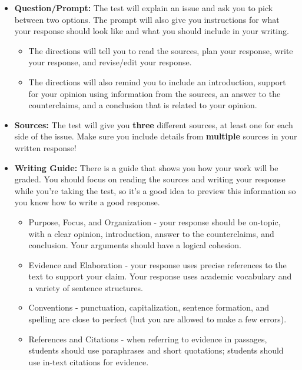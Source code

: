 \documentclass[12pt]{article}
\begin{document}
\vspace{1em}
\begin{tcolorbox}[colframe=black!60, colback=white, 
coltitle=black, colbacktitle=black!15, fonttitle=\bfseries\Large, 
title=What does the Writing Task Look Like?, halign title=center, left=10pt, right=10pt, top=10pt, bottom=15pt]

\begin{itemize}
    \item \textbf{Question/Prompt:} The test will explain an issue and ask you to pick between two options. The prompt will also give you instructions for what your response should look like and what you should include in your writing.
    \begin{itemize}
        \item The directions will tell you to read the sources, plan your response, write your response, and revise/edit your response.
        \item The directions will also remind you to include an introduction, support for your opinion using information from the sources, an answer to the counterclaims, and a conclusion that is related to your opinion.
    \end{itemize}
    \item \textbf{Sources:} The test will give you \textbf{three} different sources, at least one for each side of the issue. Make sure you include details from \textbf{multiple} sources in your written response!
    \item \textbf{Writing Guide:} There is a guide that shows you how your work will be graded. You should focus on reading the sources and writing your response while you're taking the test, so it's a good idea to preview this information so you know how to write a good response.
    \begin{itemize}
        \item Purpose, Focus, and Organization - your response should be on-topic, with a clear opinion, introduction, answer to the counterclaims, and conclusion. Your arguments should have a logical cohesion.
        \item Evidence and Elaboration - your response uses precise references to the text to support your claim. Your response uses academic vocabulary and a variety of sentence structures. 
        \item Conventions - punctuation, capitalization, sentence formation, and spelling are close to perfect (but you are allowed to make a few errors).
        \item References and Citations - when referring to evidence in passages, students should use paraphrases and short quotations; students should use in-text citations for evidence.
        
    \end{itemize}
    \end{itemize}






\end{tcolorbox}
\end{document}
